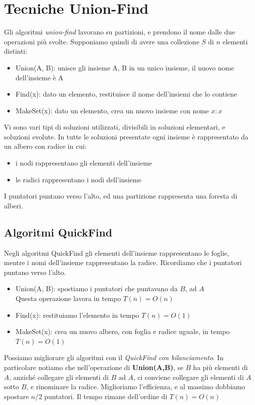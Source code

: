 \documentclass[11pt, oneside]{article}   	%
\begin{document}
\section*{Tecniche Union-Find}
Gli algoritmi \emph{union-find} lavorano su partizioni, e prendono il nome dalle due operazioni più svolte. Supponiamo quindi di avere una collezione $S$ di $n$ elementi distinti:
\begin{itemize}
\item Union(A, B): unisce gli insieme A, B in un unico insieme, il nuovo nome dell'insieme è A
\item Find(x): dato un elemento, restituisce il nome dell'insiemi che lo contiene
\item MakeSet(x): dato un elemento, crea un nuovo insieme con nome $x:{x}$
\end{itemize}
Vi sono vari tipi di soluzioni utilizzati, divisibili in soluzioni elementari, e soluzioni evolute.
In tutte le soluzioni presentate ogni insieme è rappresentato da un albero con radice in cui:
\begin{itemize}
\item i nodi rappresentano gli elementi dell'insieme
\item le radici rappresentano i nodi dell'insieme
\end{itemize}
I puntatori puntano verso l'alto, ed una partizione rappresenta una foresta di alberi.

\subsection*{Algoritmi QuickFind}
Negli algoritmi QuickFind gli elementi dell'insieme rappresentano le foglie, mentre i nomi dell'insieme rappresentano la radice. Ricordiamo che i puntatori puntano verso l'alto.
\begin{itemize}
\item Union(A, B): spostiamo i puntatori che puntavano da $B$, ad $A$\\
Questa operazione lavora in tempo $T(n) = O(n)$
\item Find(x): restituiamo l'elemento in tempo $T(n) = O(1)$
\item MakeSet(x): crea un nuovo albero, con foglia e radice uguale, in tempo $T(n) = O(1)$
\end{itemize}
Possiamo migliorare gli algoritmi con il \emph{QuickFind con bilanciamento}.
In particolare notiamo che nell'operazione di \textbf{Union(A,B)}, se $B$ ha più elementi di $A$, anziché collegare gli elementi di $B$ ad $A$, ci conviene collegare gli elementi di $A$ sotto $B$, e rinominare la radice. Miglioriamo l'efficienza, e al massimo dobbiamo spostare $n/2$ puntatori. Il tempo rimane dell'ordine di $T(n) = O(n)$ 
\end{document}
